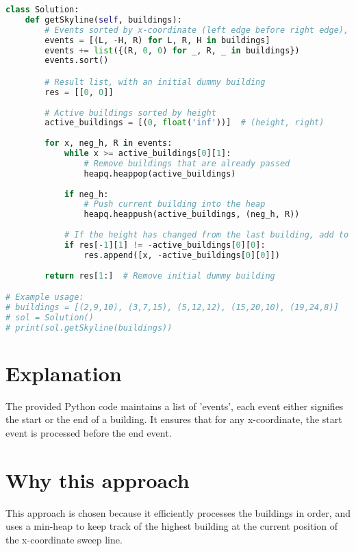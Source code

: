 \begin{fullwidth}
\begin{lstlisting}[language=Python]
class Solution:
    def getSkyline(self, buildings):
        # Events sorted by x-coordinate (left edge before right edge), and by height descending
        events = [(L, -H, R) for L, R, H in buildings]
        events += list({(R, 0, 0) for _, R, _ in buildings})
        events.sort()

        # Result list, with an initial dummy building
        res = [[0, 0]]
        
        # Active buildings sorted by height
        active_buildings = [(0, float('inf'))]  # (height, right)
        
        for x, neg_h, R in events:
            while x >= active_buildings[0][1]: 
                # Remove buildings that are already passed
                heapq.heappop(active_buildings)
            
            if neg_h: 
                # Push current building into the heap
                heapq.heappush(active_buildings, (neg_h, R))
            
            # If the height has changed from the last building, add to result
            if res[-1][1] != -active_buildings[0][0]:
                res.append([x, -active_buildings[0][0]])
        
        return res[1:]  # Remove initial dummy building

# Example usage:
# buildings = [(2,9,10), (3,7,15), (5,12,12), (15,20,10), (19,24,8)]
# sol = Solution()
# print(sol.getSkyline(buildings))
\end{lstlisting}

\end{fullwidth}

\section*{Explanation}
The provided Python code maintains a list of 'events', each event either signifies the start or the end of a building. It ensures that for any x-coordinate, the start event is processed before the end event.

\section*{Why this approach}
This approach is chosen because it efficiently processes the buildings in order, and uses a min-heap to keep track of the highest building at the current position of the x-coordinate sweep line.

